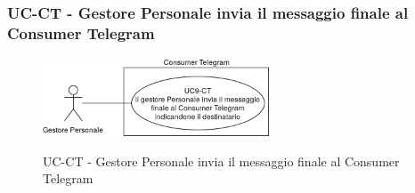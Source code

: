 \subsubsection{UC\theuccount-CT - Gestore Personale invia il messaggio finale al Consumer Telegram}
	\begin{figure}[H]
		\centering
		\includegraphics[width=0.6\textwidth]{img/casi_d'uso/UC9.png}\\
		\caption{UC\theuccount-CT - Gestore Personale invia il messaggio finale al Consumer Telegram}
	\end{figure}
